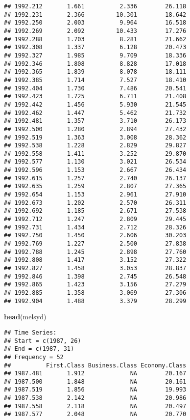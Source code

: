 \documentclass[]{book}
\newenvironment{Shaded}{\begin{snugshade}}{\end{snugshade}}
\newcommand{\KeywordTok}[1]{\textcolor[rgb]{0.13,0.29,0.53}{\textbf{#1}}}
\newcommand{\NormalTok}[1]{#1}
\begin{document}
\begin{verbatim}
## 1992.212       1.661          2.336        26.118
## 1992.231       2.366         10.301        18.642
## 1992.250       2.003          9.964        16.518
## 1992.269       2.092         10.433        17.276
## 1992.288       1.703          8.281        21.662
## 1992.308       1.337          6.128        20.473
## 1992.327       1.985          9.709        18.336
## 1992.346       1.808          8.828        17.018
## 1992.365       1.839          8.078        18.111
## 1992.385       1.714          7.527        18.410
## 1992.404       1.730          7.486        20.541
## 1992.423       1.725          6.711        21.408
## 1992.442       1.456          5.930        21.545
## 1992.462       1.447          5.462        21.732
## 1992.481       1.357          3.710        26.173
## 1992.500       1.280          2.894        27.432
## 1992.519       1.363          3.008        28.362
## 1992.538       1.228          2.829        29.827
## 1992.558       1.411          3.252        29.870
## 1992.577       1.130          3.021        26.534
## 1992.596       1.153          2.667        26.434
## 1992.615       1.257          2.740        26.137
## 1992.635       1.259          2.807        27.365
## 1992.654       1.153          2.961        27.910
## 1992.673       1.202          2.570        26.311
## 1992.692       1.185          2.671        27.538
## 1992.712       1.247          2.809        29.445
## 1992.731       1.434          2.712        28.326
## 1992.750       1.450          2.606        30.203
## 1992.769       1.227          2.500        27.838
## 1992.788       1.245          2.898        27.760
## 1992.808       1.417          3.152        27.322
## 1992.827       1.458          3.053        28.837
## 1992.846       1.398          2.745        26.548
## 1992.865       1.423          3.156        27.279
## 1992.885       1.358          3.069        27.306
## 1992.904       1.488          3.379        28.299
\end{verbatim}

\begin{Shaded}
\begin{Highlighting}[]
  \KeywordTok{head}\NormalTok{(melsyd)}
\end{Highlighting}
\end{Shaded}

\begin{verbatim}
## Time Series:
## Start = c(1987, 26) 
## End = c(1987, 31) 
## Frequency = 52 
##          First.Class Business.Class Economy.Class
## 1987.481       1.912             NA        20.167
## 1987.500       1.848             NA        20.161
## 1987.519       1.856             NA        19.993
## 1987.538       2.142             NA        20.986
## 1987.558       2.118             NA        20.497
## 1987.577       2.048             NA        20.770
\end{verbatim}
\end{document}
